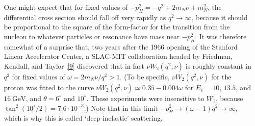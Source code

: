 One might expect that for fixed values of $-p_H^2=-q^2+2m_N\nu+m_N^2$, the differential cross section should fall off very rapidly as $q^2\to\infty$, because it should be proportional to the square of the form-factor for the transition from the nucleon to whatever particles or resonance have mass near $-p_H^2$. It was therefore somewhat of a surprise that, two years after the 1966 opening of the Stanford Linear Accelerator Center, a SLAC-MIT collaboration headed by Friedman, Kendall, and Taylor~\hyperref[ch20-ref-9]{[9]} discovered that in fact $\nu W_2(q^2,\nu)$ is roughly constant in $q^2$ for fixed values of $\omega=2m_N\nu/q^2>1$. (To be specific, $\nu W_2(q^2,\nu)$ for the proton was fitted to the curve $\nu W_2(q^2,\nu)\simeq0.35-0.004\omega$ for $E_e=10$, $13.5$, and $16\ \mathrm{GeV}$, and $\theta=6^\circ$ and $10^\circ$. These experiments were insensitive to $W_1$, because $\tan^2(10^\circ/2)=7.6\cdot10^{-3}$.) Note that in this limit $-p_H^2\to(\omega-1)q^2\to\infty$, which is why this is called `deep-inelastic' scattering.

